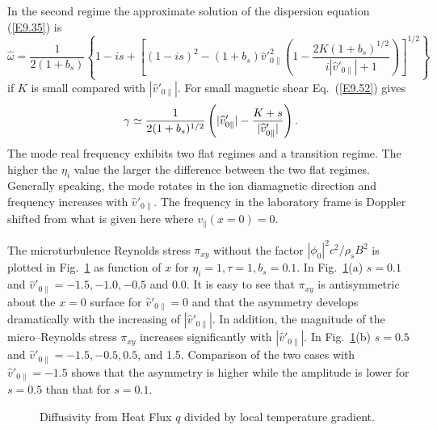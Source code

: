 \documentclass[a4paper,openany,12pt]{book}
\begin{document}
{In the second regime the approximate solution of the dispersion equation (\ref{E9.35}) is
\begin{equation}
\widehat\omega=\frac{1}{2(1+b_s)}\left\{1-is+\left[(1-is)^2-(1+b_s)\widehat v'^2_{0\|}\left(1-\frac{2K(1+b_s)^{1/2}}{i|\widehat v'_{0\|}|+1}\right)\right]^{1/2}\right\}\label{E9.53}
\end{equation}
if $K$ is small compared with $|\widehat v'_{0\|}|$. For small magnetic shear Eq.~(\ref{E9.52}) gives
\begin{equation}
\gamma\simeq\frac{1}{2(1+b_s)^{1/2}}\left(|\widehat v'_{0\|}|-{K+s\over
|\widehat v'_{0\|}|}\right).\label{E9.54}
\end{equation}
The mode real frequency exhibits two flat regimes and a transition regime. The higher the $\eta_i$ value the larger the difference between the two flat regimes. Generally speaking, the mode rotates in the ion diamagnetic direction and frequency increases with $\widehat v'_{0\|}$. The frequency in the laboratory frame is Doppler shifted from what is given here where $v_\|(x=0)=0.$

The microturbulence Reynolds stress $\pi_{xy}$ without the factor $|\phi_0|^2c^2/\rho_s B^2$ is plotted in Fig.~\ref{F9.38} as function of $x$ for $\eta_i=1, \tau=1, b_s=0.1$. In Fig.~\ref{F9.38}(a) $s=0.1$ and $\widehat v'_{0\|}=-1.5, -1.0, -0.5$ and 0.0. It is easy to see that $\pi_{xy}$ is antisymmetric about the $x=0$ surface for $\widehat v'_{0\|}=0$ and that the asymmetry develops dramatically with the increasing of $|\widehat v'_{0\|}|$. In addition, the magnitude of the micro--Reynolds stress $\pi_{xy}$ increases significantly with $|\widehat v'_{0\|}|$. In Fig.~\ref{F9.38}(b) $s=0.5$ and 
$\widehat v'_{0\|}=-1.5, -0.5,0.5$, and 1.5. Comparison of the two cases with $\widehat v'_{0\|}=-1.5$ shows that the asymmetry is higher while the amplitude is lower for $s=0.5$ than that for $s=0.1$.
\begin{figure}[H]
\centerline{}
\caption{Diffusivity from Heat Flux $q$ divided by local temperature gradient.}
\label{F9.38}
\end{figure}
%

}
\end{document}
